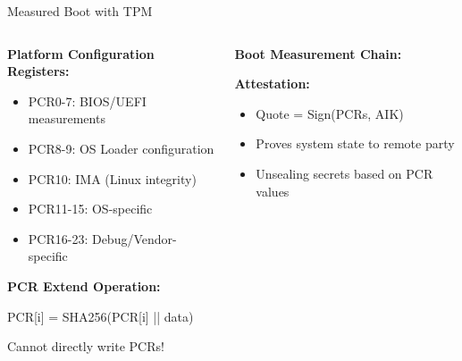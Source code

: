 \documentclass[aspectratio=169,12pt]{beamer}
\begin{document}
\begin{frame}{Measured Boot with TPM}
    \begin{columns}
        \begin{column}{0.5\textwidth}
            \textbf{Platform Configuration Registers:}
            \begin{itemize}
                \item PCR0-7: BIOS/UEFI measurements
                \item PCR8-9: OS Loader configuration
                \item PCR10: IMA (Linux integrity)
                \item PCR11-15: OS-specific
                \item PCR16-23: Debug/Vendor-specific
            \end{itemize}
            
            \vspace{0.3cm}
            \textbf{PCR Extend Operation:}
            \begin{tcolorbox}[colback=gray!10]
                \small
                PCR[i] = SHA256(PCR[i] || data)
            \end{tcolorbox}
            \small Cannot directly write PCRs!
        \end{column}
        \begin{column}{0.5\textwidth}
            \textbf{Boot Measurement Chain:}
            
            \vspace{0.3cm}
            \textbf{Attestation:}
            \begin{itemize}
                \item Quote = Sign(PCRs, AIK)
                \item Proves system state to remote party
                \item Unsealing secrets based on PCR values
            \end{itemize}
        \end{column}
    \end{columns}
\end{frame}
\end{document}
